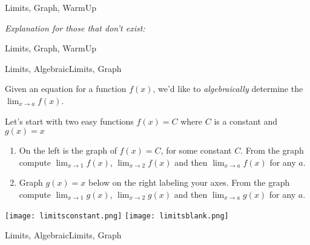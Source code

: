 \begin{tagblock}{Limits, Graph, WarmUp}
\begin{question}
\emph{Explanation for those that don't exist:}
	
	
\begin{tags}
	    Limits, Graph, WarmUp
\end{tags}
	
\begin{diary}
	    
\end{diary}
	
\begin{solution}
	  
\end{solution}
	
\end{question}

\end{tagblock}



\begin{tagblock}{Limits, AlgebraicLimits, Graph}
\begin{question}
	Given an equation for a function $f(x)$, we'd like to \emph{algebraically} determine the $\lim_{x \to a} f(x)$.  

Let's start with two easy functions $f(x) = C$ where $C$ is a constant and $g(x) =x$
\begin{enumerate}
\item On the left is the graph of $f(x) = C$, for some constant $C$.  From the graph compute $\lim_{x \to 1} f(x)$,   $\lim_{x \to 2} f(x)$ and then  $\lim_{x \to a} f(x)$ for any $a$.  
\item Graph $g(x) = x$ below on the right labeling your axes.  From the graph compute $\lim_{x \to 1} g(x)$,   $\lim_{x \to 2} g(x)$ and then  $\lim_{x \to a} g(x)$ for any $a$. 
\end{enumerate}

\texttt{[image: limitsconstant.png]} \hspace{.5in} \texttt{[image: limitsblank.png]} 
	
	
\begin{tags}
	    Limits, AlgebraicLimits, Graph
\end{tags}
	
\begin{diary}
	    
\end{diary}
	
\begin{solution}
	  
\end{solution}
	
\end{question}

\end{tagblock}

